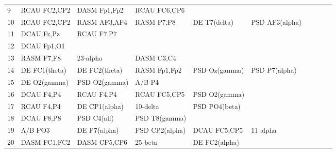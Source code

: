 \begin{landscape}
\begin{table}[]
\begin{tabular}{l|llllllll}
9        & RCAU FC2,CP2   & DASM Fp1,Fp2   & RCAU FC6,CP6   &                &                &                &                &                &               &              \\
10       & RCAU FC2,CP2   & RASM AF3,AF4   & RASM P7,P8     & DE T7(delta)   & PSD AF3(alpha) &                &                &                &               &              \\
11       & DCAU Fz,Pz     & RCAU F7,P7     &                &                &                &                &                &                &               &              \\
12       & DCAU Fp1,O1    &                &                &                &                &                &                &                &               &              \\
13       & RASM F7,F8     & 23-alpha       & DASM C3,C4     &                &                &                &                &                &               &              \\
14       & DE FC1(theta)  & DE FC2(theta)  & RASM Fp1,Fp2   & PSD Oz(gamma)  & PSD P7(alpha)  &                &                &                &               &              \\
15       & DE O2(gamma)   & PSD O2(gamma)  & A/B P4         &                &                &                &                &                &               &              \\
16       & DCAU F4,P4     & RCAU F4,P4     & RCAU FC5,CP5   & PSD O2(gamma)  &                &                &                &                &               &              \\
17       & RCAU F4,P4     & DE CP1(alpha)  & 10-delta       & PSD PO4(beta)  &                &                &                &                &               &              \\
18       & DCAU F8,P8     & PSD C4(all)    & PSD T8(gamma)  &                &                &                &                &                &               &              \\
19       & A/B PO3        & DE P7(alpha)   & PSD CP2(alpha) & DCAU FC5,CP5   & 11-alpha       &                &                &                &               &              \\
20       & DASM FC1,FC2   & DASM CP5,CP6   & 25-beta        & DE FC2(alpha)  &                &                &                &                &               &              \\

\end{tabular}
\end{table}
\end{landscape}
